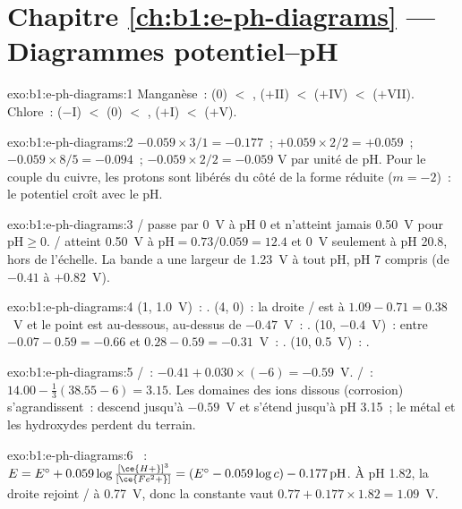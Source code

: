 \section*{Chapitre \ref{ch:b1:e-ph-diagrams} --- Diagrammes potentiel--pH}

\begin{solution}{exo:b1:e-ph-diagrams:1}
Manganèse~:  (0) $<$ ,  ($+$II) $<$ 
($+$IV) $<$  ($+$VII). Chlore~:  ($-$I) $<$  (0)
$<$ ,  ($+$I) $<$  ($+$V).
\end{solution}

\begin{solution}{exo:b1:e-ph-diagrams:2}
$-0.059 \times 3/1 = -0.177$~; $+0.059 \times 2/2 = +0.059$~;
$-0.059 \times 8/5 = -0.094$~; $-0.059 \times 2/2 = -0.059$ V par unité
de pH. Pour le couple du cuivre, les protons sont libérés du côté de la
forme réduite ($m = -2$)~: le potentiel croît avec le pH.
\end{solution}

\begin{solution}{exo:b1:e-ph-diagrams:3}
/ passe par 0~V à pH 0 et n'atteint jamais 0.50~V pour
$\mathrm{pH} \geqslant 0$. / atteint 0.50~V à
$\mathrm{pH} = 0.73/0.059 = 12.4$ et 0~V seulement à pH 20.8, hors de
l'échelle. La bande a une largeur de \qty{1.23}{V} à tout pH, pH 7
compris (de $-0.41$ à $+0.82$~V).
\end{solution}

\begin{solution}{exo:b1:e-ph-diagrams:4}
(1, 1.0~V)~: . (4, 0)~: la droite / est
à $1.09 - 0.71 = 0.38$~V et le point est au-dessous, au-dessus de
$-0.47$~V~:
. (10, $-0.4$~V)~: entre $-0.07 - 0.59 = -0.66$ et $0.28 -
0.59 = -0.31$~V~: . (10, 0.5~V)~: .
\end{solution}

\begin{solution}{exo:b1:e-ph-diagrams:5}
/~: $-0.41 + 0.030 \times (-6) = -0.59$~V.
/~: $14.00 - \frac13(38.55 - 6) = 3.15$. Les
domaines des ions dissous (corrosion) s'agrandissent~: 
descend jusqu'à $-0.59$~V et  s'étend jusqu'à pH 3.15~; le
métal et les hydroxydes perdent du terrain.
\end{solution}

\begin{solution}{exo:b1:e-ph-diagrams:6}
~: $E = E^\circ + 0.059\log\frac{[\ce{H+}]^3}{[\ce{Fe^2+}]}
= (E^\circ - 0.059\log c) - 0.177\,\mathrm{pH}$. À pH 1.82, la droite
rejoint / à 0.77~V, donc la constante vaut
$0.77 + 0.177 \times 1.82
= 1.09$~V.
\end{solution}

